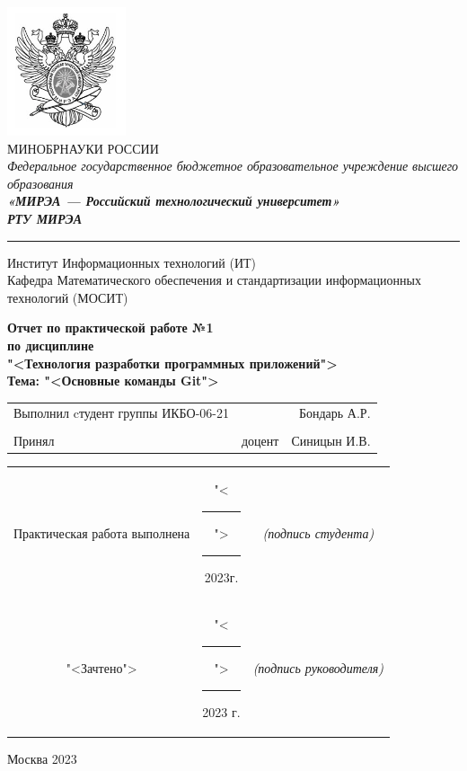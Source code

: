 \begin{center}
	\includegraphics[scale=0.5]{./res/logo.png}\\
	\normalsize{МИНОБРНАУКИ РОССИИ}\\
	\normalsize{\itshape Федеральное государственное бюджетное образовательное учреждение высшего образования}\\
	\normalsize{\bfseries\itshape«МИРЭА --- Российский технологический университет»}\\
	\large{\bfseries\itshape РТУ МИРЭА}\\
	\bigskip \hrule \smallskip
	\normalsize{Институт Информационных технологий (ИТ)}\\
	\vfill
	\normalsize{Кафедра Математического обеспечения и стандартизации информационных технологий (МОСИТ)}\\
	\vfill
	\begin{normalsize}
	  \textbf{
	    Отчет по практической работе №1\\
	    по дисциплине\\
	    "<Технология разработки программных приложений">\\
	    Тема: "<Основные команды Git">\\
	  }
	\end{normalsize}
	\vfill
	\vfill
	\begin{small}
		\begin{tabular}{lrr}
			Выполнил cтудент группы ИКБО-06-21 & & Бондарь А.Р.\\\\
			Принял & доцент & Синицын И.В.\\
		\end{tabular}
	\end{small}
	\vfill
	\begin{footnotesize}
		\begin{tabular}{ccc}
			Практическая  работа выполнена
			& "<\rule{1ex}{.5pt}">\rule{7ex}{.5pt}2023г.
			& \textit{(подпись студента)}\\
			"<Зачтено"> 
			& "<\rule{1ex}{.5pt}">\rule{7ex}{.5pt}2023 г.
			& \textit{(подпись руководителя)}\\
		\end{tabular}
	\end{footnotesize}
	\vfill
\end{center}

\begin{center} Москва 2023 \end{center}

\thispagestyle{empty}
